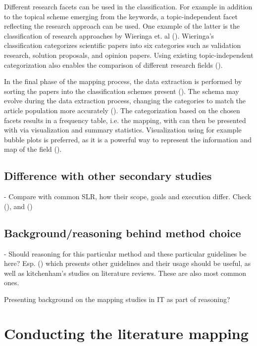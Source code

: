 \documentclass[utf8,english]{gradu3}
\begin{document}
Different research facets can be used in the classification. For example in
addition to the topical scheme emerging from the keywords, a topic-independent
facet reflecting the research approach can be used. One example of the latter is
the classification of research approaches by Wieringa et. al
(\cite*{wieringa2006}). Wieringa's classification categorizes scientific papers
into six categories such as validation research, solution proposals, and opinion
papers. Using existing topic-independent categorization also enables the
comparison of  different research fields (\cite{petersen2015}).

In the final phase of the mapping process, the data extraction is performed by
sorting the papers into the classification schemes present
(\cite{petersen2008}). The schema may evolve during the data extraction process,
changing the categories to match the article population more accurately
(\cite{petersen2015}). The categorization based on the chosen facets results in
a frequency table, i.e. the mapping, with can then be presented with via
visualization and summary statistics. Visualization using for example bubble
plots is preferred, as it is a powerful way to represent the information and map
of the field (\cite{petersen2008}).


\section{Difference with other secondary studies}

- Compare with common SLR, how their scope, goals and execution differ.
Check (\cite{kitchenham2007}), and (\cite{kitchenham2010})

\section{Background/reasoning behind method choice}

- Should reasoning for this particular method and these particular guidelines
be here? Esp. (\cite{petersen2015}) which presents
other guidelines and their usage should be useful, as well as kitchenham's 
studies on literature reviews. These are also most common ones.

Presenting background on the mapping studies in IT as part of reasoning?

\chapter{Conducting the literature mapping}
\end{document}
